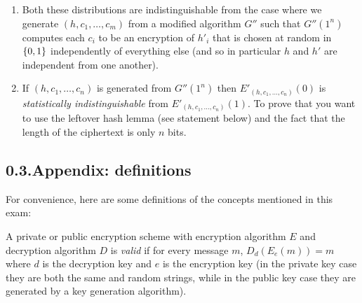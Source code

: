 \documentclass{article}
\begin{document}
\begin{enumerate}[noitemsep,topsep=\mdcompacttopsep]%

\item{}Both these distributions are indistinguishable from the case where we generate $(h,c_1,\ldots,c_m)$ from a modified algorithm $G''$ such that $G''(1^n)$ computes each $c_i$ to be an  encryption of $h'_i$ that is chosen at random in $\{0,1\}$ independently of everything else (and so in particular $h$ and $h'$ are independent from one another).%

\item{}If $(h,c_1,\ldots,c_n)$ is generated from $G''(1^n)$ then $E'_{(h,c_1,\ldots,c_n)}(0)$ is \emph{statistically indistinguishable} from $E'_{(h,c_1,\ldots,c_n)}(1)$. To prove that you want to use the leftover hash lemma (see statement below) and the fact that the length of the ciphertext is only $n$ bits.%
\end{enumerate}%

\subsection{0.3.\hspace*{0.5em}Appendix: definitions}\label{sec-appendix--definitions}%

\noindent{}For convenience, here are some definitions of the concepts mentioned in this exam:%

A private or public  encryption scheme with encryption algorithm $E$ and decryption algorithm $D$ is \emph{valid} if for every message $m$, $D_d(E_e(m))=m$ where $d$ is the decryption key  and $e$ is the encryption key (in the private key case they are both the same and random strings, while in the public key case they are generated by a key generation algorithm).%
\end{document}
